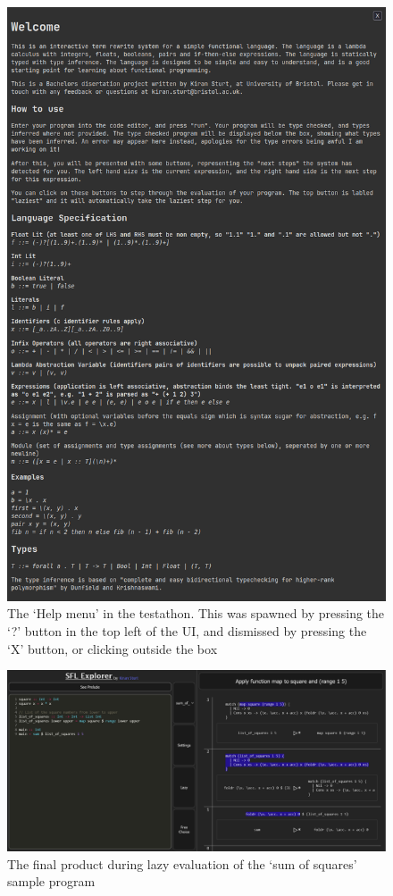 \begin{figure}[h]
    \centering
    \includegraphics[width=0.9\linewidth]{images/testathon_help_menu_cropped.png} 
    \captionsetup{justification=centering}
    \caption{The `Help menu' in the testathon. This was spawned by pressing the `?' button in the top left of the UI, and dismissed by pressing the `X' button, or clicking outside the box}
    \label{fig:screenshot_testathon_2}
\end{figure}

\begin{figure}[h]
    \centering
    \includegraphics[width=\linewidth]{images/final_dark.png} 
    \captionsetup{justification=centering}
    \caption{The final product during lazy evaluation of the `sum of squares' sample program}
    \label{fig:screenshot_final_dark}
\end{figure}

